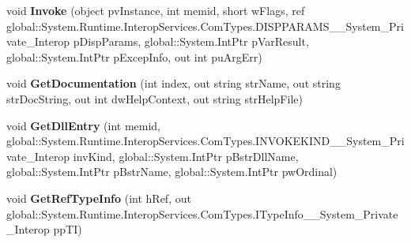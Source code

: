 \begin{DoxyCompactItemize}
\mbox{\label{interface_system_1_1_runtime_1_1_interop_services_1_1_com_types_1_1_i_type_info_____system___private___interop_a75ad94dc5c9adbb0a9b1de1c846b395e}} 
void {\bfseries Invoke} (object pv\+Instance, int memid, short w\+Flags, ref global\+::\+System.\+Runtime.\+Interop\+Services.\+Com\+Types.\+D\+I\+S\+P\+P\+A\+R\+A\+M\+S\+\_\+\+\_\+\+System\+\_\+\+Private\+\_\+\+Interop p\+Disp\+Params, global\+::\+System.\+Int\+Ptr p\+Var\+Result, global\+::\+System.\+Int\+Ptr p\+Excep\+Info, out int pu\+Arg\+Err)
\item 
\mbox{\label{interface_system_1_1_runtime_1_1_interop_services_1_1_com_types_1_1_i_type_info_____system___private___interop_a3c7cc84cf38e70c6a8f2599ea99597fb}} 
void {\bfseries Get\+Documentation} (int index, out string str\+Name, out string str\+Doc\+String, out int dw\+Help\+Context, out string str\+Help\+File)
\item 
\mbox{\label{interface_system_1_1_runtime_1_1_interop_services_1_1_com_types_1_1_i_type_info_____system___private___interop_a943dffd3908114326ac1e08d036b2aa7}} 
void {\bfseries Get\+Dll\+Entry} (int memid, global\+::\+System.\+Runtime.\+Interop\+Services.\+Com\+Types.\+I\+N\+V\+O\+K\+E\+K\+I\+N\+D\+\_\+\+\_\+\+System\+\_\+\+Private\+\_\+\+Interop inv\+Kind, global\+::\+System.\+Int\+Ptr p\+Bstr\+Dll\+Name, global\+::\+System.\+Int\+Ptr p\+Bstr\+Name, global\+::\+System.\+Int\+Ptr pw\+Ordinal)
\item 
\mbox{\label{interface_system_1_1_runtime_1_1_interop_services_1_1_com_types_1_1_i_type_info_____system___private___interop_af4dec31689d92f94d3290424d918deaf}} 
void {\bfseries Get\+Ref\+Type\+Info} (int h\+Ref, out global\+::\+System.\+Runtime.\+Interop\+Services.\+Com\+Types.\+I\+Type\+Info\+\_\+\+\_\+\+System\+\_\+\+Private\+\_\+\+Interop pp\+TI)
\item 
\mbox{\label{interface_system_1_1_runtime_1_1_interop_services_1_1_com_types_1_1_i_type_info_____system___private___interop_ac1887de5b20a5e26671bbe3eea33a1e0}} 

\end{DoxyCompactItemize}
